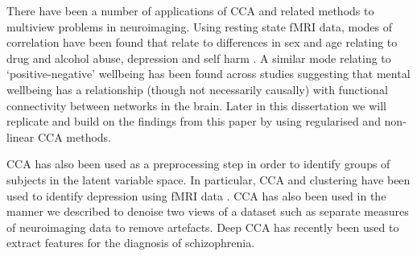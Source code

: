 There have been a number of applications of CCA and related methods to multiview problems in neuroimaging.
Using resting state fMRI data, modes of correlation have been found that relate to differences in sex and age relating to drug and alcohol abuse, depression and self harm \cite{mihalik2019brain}.
A similar mode relating to `positive-negative' wellbeing has been found across studies \cite{smith2015positive}suggesting that mental wellbeing has a relationship (though not necessarily causally) with functional connectivity between networks in the brain.
Later in this dissertation we will replicate and build on the findings from this paper by using regularised and non-linear CCA methods.

CCA has also been used as a preprocessing step in order to identify groups of subjects in the latent variable space.
In particular, CCA and clustering have been used to identify depression using fMRI data\cite{dinga2019evaluating} \cite{drysdale2017resting}.
CCA has also been used in the manner we described to denoise two views of a dataset such as separate measures of neuroimaging data \cite{zhuang2020technical} to remove artefacts.
Deep CCA has recently been used to extract features for the diagnosis of schizophrenia\cite{qi2016deep}.





